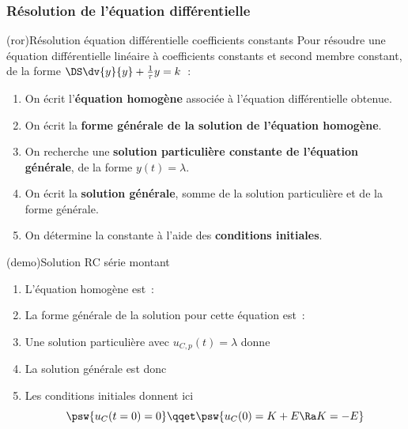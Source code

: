 \documentclass[../../main/main.tex]{subfiles}
\begin{document}
\subsubsection{Résolution de l'équation différentielle}
\begin{tcb}[label=impo:eqres](ror){Résolution équation différentielle
			coefficients constants}
	Pour résoudre une équation différentielle linéaire à
	coefficients constants et second membre constant, de la forme
	$\DS \dv{y}{y} + \frac{1}{\tau}y = k$~:
	\begin{enumerate}[label=\sqenumi]
		\item On écrit l'\textbf{équation homogène} associée à
		      l'équation différentielle obtenue.
		\item On écrit la \textbf{forme générale de la solution de
			      l'équation homogène}.
		\item On recherche une \textbf{solution particulière
			      constante de l'équation générale}, de la forme $y(t) =
			      \lambda$.
		\item On écrit la \textbf{solution générale}, somme de la
		      solution particulière et de la forme générale.
		\item On détermine la constante à l'aide des
		      \textbf{conditions initiales}.
	\end{enumerate}
\end{tcb}
\begin{tcb}[label=demo:rcsolu](demo){Solution RC série montant}
	\begin{enumerate}[label=\sqenumi]
		\item L'équation homogène est~:
		      \psw{
		      \[
			      \dv{u_{C,h}}{t} + \frac{1}{\tau}u_{C,h} = 0
		      \]
		      }
		      \vspace{-15pt}
		\item La forme générale de la solution pour cette équation est~:
		      \psw{
			      \[
				      u_{C,h}(t) = K\exp\left( -\frac{t}{\tau} \right)
			      \]
		      }
		      \vspace{-15pt}
		\item Une solution particulière avec $u_{C,p}(t) = \lambda$ donne
		\item La solution générale est donc
		      \psw{
			      \[
				      u_C(t) = E + K\exp \left( - \frac{t}{\tau} \right)
			      \]
		      }
		      \vspace{-15pt}
		\item Les conditions initiales donnent ici
		      \[
			      \psw{u_C(t=0) = 0}
			      \qqet
			      \psw{u_C(0) = K + E \Ra K=-E}
		      \]
	\end{enumerate}
\end{tcb}
\end{document}
